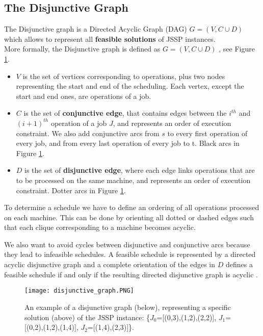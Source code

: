 \documentclass[12pt]{article}
\begin{document}
\subsection{The Disjunctive Graph}
\label{sec:disjunctive}
The Disjunctive graph is a Directed Acyclic Graph (DAG) $G = (V,C \cup D)$ which allows to represent all \textbf{feasible solutions} of JSSP instances.\\ 
More formally, the Disjunctive graph is defined as $G = (V,C \cup D)$ \cite{disjunctive_graph}, see Figure \ref{img:disjunctive_graph}.
\begin{itemize}
    \item $V$ is the set of vertices corresponding to operations, plus two nodes representing the start and end of the scheduling. Each vertex, except the start and end ones, are operations of a job.
    \item $C$ is the set of \textbf{conjunctive edge}, that contains edges between the $i^{th}$ and $(i+1)^{th}$ operation of a job $J$, and represents an order of execution constraint. We also add conjunctive arcs from $s$ to every first operation of every job, and from every last operation of every job to t. Black arcs in Figure \ref{img:disjunctive_graph}.
    \item $D$ is the set of \textbf{disjunctive edge}, where each edge links operations that are to be processed on the same machine, and represents an order of execution constraint. Dotter arcs in Figure \ref{img:disjunctive_graph}.
\end{itemize}
To determine a schedule we have to define an ordering of all operations processed on each machine. This can be done by orienting all dotted or dashed edges such that each clique corresponding to a machine becomes acyclic.

\medbreak
We also want to avoid cycles between disjunctive and conjunctive arcs because they lead to infeasible schedules. A feasible schedule is represented by a directed acyclic disjunctive graph and a complete orientation of the edges in $D$ defines a feasible schedule if and only if the resulting directed disjunctive graph is acyclic \cite{disjunctive_graph}.

\begin{figure}[H]
    \centering
    \texttt{[image: disjunctive\_graph.PNG]}
    \caption{An example of a disjunctive graph (below), representing a specific solution (above) of the JSSP instance: \{$J_0$=[(0,3),(1,2),(2,2)], $J_1$=[(0,2),(1,2),(1,4)], $J_2$=[(1,4),(2,3)]\}.}
    \label{img:disjunctive_graph}
\end{figure}
\end{document}
